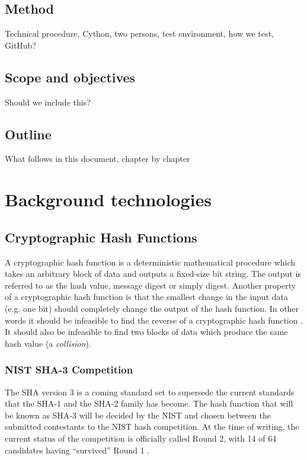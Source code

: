 \documentclass[english,12pt,a4paper]{book}
\begin{document}
\section{Method}

Technical procedure, Cython, two persons, test environment, how we test,
GitHub?

\section{Scope and objectives}

Should we include this?

\section{Outline}

What follows in this document, chapter by chapter

\chapter{Background technologies}

\section{Cryptographic Hash Functions}

A cryptographic hash function is a deterministic mathematical procedure which
takes an arbitrary block of data and outputs a fixed-size bit string. The output
is referred to as the hash value, message digest or simply digest.
Another property of a cryptographic hash function is that the smallest change in
the input data (e.g. one bit) should completely change the output of the hash
function. In other words it should be infeasible to find the reverse of a
cryptographic hash function \cite[p. 335]{stallings}. It should also be infeasible to
find two blocks of data which produce the same hash value (a \emph{collision}).

\subsection{NIST SHA-3 Competition}
The \ac{SHA} version 3 is a coming standard set to supersede the current
standards that the \ac{SHA}-1 and the \ac{SHA}-2 family has become. The hash
function that will be known as \ac{SHA}-3 will be decided by the \ac{NIST} and
chosen between the submitted contestants to the \ac{NIST} hash competition.
At the time of writing, the current status of the competition is officially
called Round 2, with 14 of 64 candidates having ``survived'' Round 1
\cite{s_fedreg}.
\end{document}
